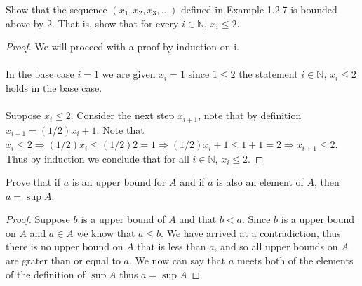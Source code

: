 \documentclass[12pt]{article}
\makeatletter
\theoremstyle{homework}
\newenvironment{exercise}[1]
{\def\@currentlabel{#1}\exercisecore}
{\endexercisecore}
\newcommand{\Nats}{\ensuremath{\mathbb N}}
\makeatother
\begin{document}
\newpage
\begin{exercise}{1.2.9} Show that the sequence $(x_1, x_2, x_3,\ldots)$ defined in Example
1.2.7 is bounded above by 2.  That is, show that for every $i\in\Nats$, $x_i\le 2$.
\end{exercise}
\begin{proof}
We will proceed with a proof by induction on i.\\\\
In the base case $i=1$ we are given $x_i=1$ since $1\le 2$ the statement $i\in\Nats$, $x_i\le 2$ holds in the base case.\\\\
Suppose $x_i\le 2$.  Consider the next step $x_{i+1}$, note that by definition $x_{i+1}=(1/2) x_i+1$.  Note that $x_i\le 2\Rightarrow (1/2) x_i\le (1/2) 2=1\Rightarrow (1/2) x_i+1\le 1+1=2\Rightarrow x_{i+1}\le 2$.  Thus by induction we conclude that for all $i\in\Nats$, $x_i\le 2$.
\end{proof}

\begin{exercise}{1.3.7} Prove that if $a$ is an upper bound for $A$ and if $a$ is also an element of $A$,
then $a=\sup A$.
\end{exercise}
\begin{proof}
Suppose $b$ is a upper bound of $A$ and that $b<a$.  Since $b$ is a upper bound on $A$ and $a\in A$ we know that $a\le b$.  We have arrived at a contradiction, thus there is no upper bound on $A$ that is less than $a$, and so all upper bounds on $A$ are grater than or equal to $a$.  We now can say that $a$ meets both of the elements of the definition of $\sup A$ thus $a=\sup A$
\end{proof}
\end{document}
